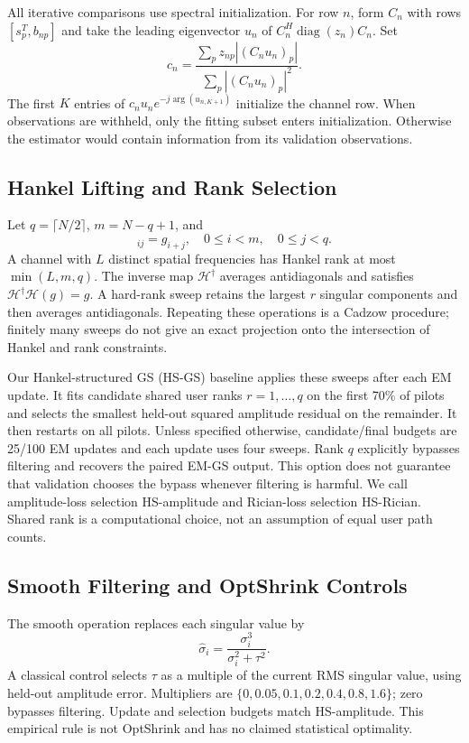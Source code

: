 \documentclass[10pt,journal,letterpaper]{IEEEtran}
\newcommand{\HH}{\mathcal{H}}
\DeclareMathOperator{\diag}{diag}
\begin{document}
All iterative comparisons use spectral initialization. For row $n$, form $C_n$ with rows $[s_p^T,b_{np}]$ and take the leading eigenvector $u_n$ of $C_n^H\diag(z_n)C_n$. Set
\begin{equation}
 c_n=\frac{\sum_p z_{np}|(C_nu_n)_p|}{\sum_p|(C_nu_n)_p|^2}.
\end{equation}
The first $K$ entries of $c_nu_ne^{-j\arg(u_{n,K+1})}$ initialize the channel row. When observations are withheld, only the fitting subset enters initialization. Otherwise the estimator would contain information from its validation observations.

\subsection{Hankel Lifting and Rank Selection}
Let $q=\lceil N/2\rceil$, $m=N-q+1$, and
\begin{equation}
 [\HH(g)]_{ij}=g_{i+j},\quad 0\le i<m,\quad0\le j<q.
\end{equation}
A channel with $L$ distinct spatial frequencies has Hankel rank at most $\min(L,m,q)$. The inverse map $\HH^\dagger$ averages antidiagonals and satisfies $\HH^\dagger\HH(g)=g$. A hard-rank sweep retains the largest $r$ singular components and then averages antidiagonals. Repeating these operations is a Cadzow procedure; finitely many sweeps do not give an exact projection onto the intersection of Hankel and rank constraints.

Our Hankel-structured GS (HS-GS) baseline applies these sweeps after each EM update. It fits candidate shared user ranks $r=1,\ldots,q$ on the first 70\% of pilots and selects the smallest held-out squared amplitude residual on the remainder. It then restarts on all pilots. Unless specified otherwise, candidate/final budgets are 25/100 EM updates and each update uses four sweeps. Rank $q$ explicitly bypasses filtering and recovers the paired EM-GS output. This option does not guarantee that validation chooses the bypass whenever filtering is harmful. We call amplitude-loss selection HS-amplitude and Rician-loss selection HS-Rician. Shared rank is a computational choice, not an assumption of equal user path counts.

\subsection{Smooth Filtering and OptShrink Controls}
The smooth operation replaces each singular value by
\begin{equation}
 \widehat\sigma_i=\frac{\sigma_i^3}{\sigma_i^2+\tau^2}.
 \label{eq:shrink}
\end{equation}
A classical control selects $\tau$ as a multiple of the current RMS singular value, using held-out amplitude error. Multipliers are $\{0,0.05,0.1,0.2,0.4,0.8,1.6\}$; zero bypasses filtering. Update and selection budgets match HS-amplitude. This empirical rule is not OptShrink and has no claimed statistical optimality.
\end{document}

